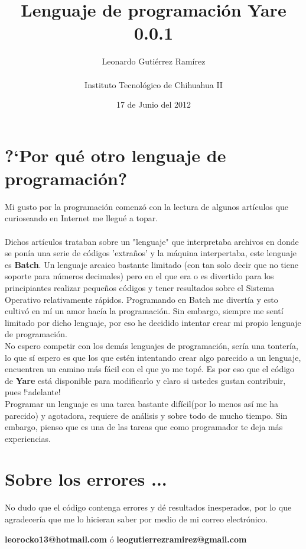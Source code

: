 \documentclass[11pt]{article}
\title{\textbf{Lenguaje de programaci\'on Yare 0.0.1}}
\author{Leonardo Gutiérrez Ramírez\\
		\\
		Instituto Tecnológico de Chihuahua II}
\date{17 de Junio del 2012}
\begin{document}
\maketitle
\section{?`Por qu\'e otro lenguaje de programaci\'on?}

Mi gusto por la programaci\'on comenz\'o con la lectura de algunos art\'iculos que curioseando en Internet me llegu\'e a topar.\\
\\Dichos art\'iculos trataban sobre un "lenguaje" que interpretaba archivos en donde se pon\'ia una serie de c\'odigos 'extra\~nos' y la
m\'aquina interpertaba, este lenguaje es {\bf Batch}. Un lenguaje arcaico bastante limitado (con tan solo decir que no tiene soporte para 
n\'umeros decimales) pero en el que era o es divertido para los principiantes realizar peque\~nos c\'odigos y tener resultados sobre el Sistema Operativo
relativamente r\'apidos. Programando en Batch me divert\'ia y esto cultiv\'o en m\'i un amor hac\'ia la programaci\'on. Sin embargo, siempre
me sent\'i limitado por dicho lenguaje, por eso he decidido intentar crear mi propio lenguaje de programaci\'on.\\

No espero competir con los dem\'as lenguajes de programaci\'on, ser\'ia una tonter\'ia, lo que s\'i espero es que los que est\'en intentando
crear algo parecido a un lenguaje, encuentren un camino m\'as f\'acil con el que yo me top\'e. Es por eso que el c\'odigo de {\bf Yare} est\'a
disponible para modificarlo y claro si ustedes gustan contribuir, pues !`adelante!\\

Programar un lenguaje es una tarea bastante dif\'icil(por lo menos as\'i me ha parecido) y agotadora, requiere de an\'alisis y sobre todo de 
mucho tiempo. Sin embargo, pienso que es una de las tareas que como programador te deja m\'as experiencias.

\section{Sobre los errores ...}
No dudo que el c\'odigo contenga errores y d\'e resultados inesperados, por lo que agradecer\'ia que me lo hicieran saber por medio de mi
correo electr\'onico.

{\bf leorocko13@hotmail.com} \'o {\bf leogutierrezramirez@gmail.com}\\
\end{document}
